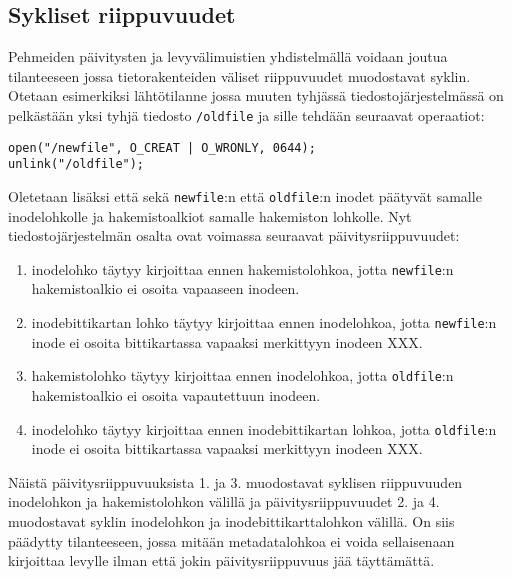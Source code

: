 \subsection{Sykliset riippuvuudet}
Pehmeiden päivitysten ja levyvälimuistien yhdistelmällä voidaan joutua tilanteeseen jossa tietorakenteiden väliset riippuvuudet muodostavat syklin.
Otetaan esimerkiksi lähtötilanne jossa muuten tyhjässä tiedostojärjestelmässä on pelkästään yksi tyhjä tiedosto \texttt{/oldfile} ja sille tehdään seuraavat operaatiot:
%
\begin{verbatim}
open("/newfile", O_CREAT | O_WRONLY, 0644);
unlink("/oldfile");
\end{verbatim}
%
Oletetaan lisäksi että sekä \texttt{newfile}:n että \texttt{oldfile}:n inodet päätyvät samalle inodelohkolle ja hakemistoalkiot samalle hakemiston lohkolle.
Nyt tiedostojärjestelmän osalta ovat voimassa seuraavat päivitysriippuvuudet:
\begin{enumerate}
    \item{inodelohko täytyy kirjoittaa ennen hakemistolohkoa, jotta \texttt{newfile}:n hakemistoalkio ei osoita vapaaseen inodeen.}
    \item{inode\-bitti\-kartan lohko täytyy kirjoittaa ennen inode\-lohkoa, jotta \texttt{newfile}:n inode ei osoita bitti\-kartassa vapaaksi merkittyyn inodeen XXX.}
    \item{hakemisto\-lohko täytyy kirjoittaa ennen inode\-lohkoa, jotta \texttt{oldfile}:n hakemisto\-alkio ei osoita vapautettuun inodeen.}
    \item{inode\-lohko täytyy kirjoittaa ennen inode\-bitti\-kartan lohkoa, jotta \texttt{oldfile}:n inode ei osoita bitti\-kartassa vapaaksi merkittyyn inodeen XXX.}
\end{enumerate}
Näistä päivitysriippuvuuksista 1. ja 3. muodostavat syklisen riippuvuuden inodelohkon ja hakemistolohkon välillä ja päivitysriippuvuudet 2. ja 4. muodostavat syklin inodelohkon ja inodebittikarttalohkon välillä.
On siis päädytty tilanteeseen, jossa mitään metadatalohkoa ei voida sellaisenaan kirjoittaa levylle ilman että jokin päivitysriippuvuus jää täyttämättä.

